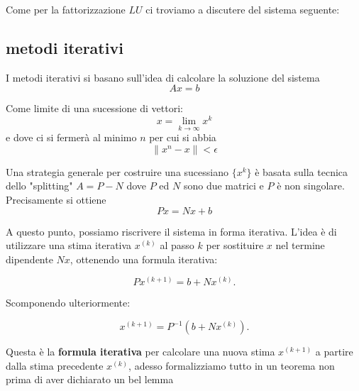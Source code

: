 Come per la fattorizzazione $LU$ ci troviamo a discutere del sistema seguente:

\subsection{metodi iterativi}
I metodi iterativi si basano sull'idea di calcolare la soluzione del sistema 
\[
    Ax = b
\]

Come limite di una sucessione di vettori:
\[
    x = \lim_{k\to\infty}x^k
\]
e dove ci si fermerà al minimo $n$ per cui si abbia 
\[
    \|x^n-x\|<\epsilon 
\]

Una strategia generale per costruire una sucessiano $\{x^k\}$ è basata sulla tecnica dello "splitting" $A = P- N $ dove $P$ ed $N$ sono due matrici e $P$ è non singolare. Precisamente si ottiene
\[
    Px = Nx + b
\]

A questo punto, possiamo riscrivere il sistema in forma iterativa. L'idea è di utilizzare una stima iterativa \( x^{(k)} \) al passo \( k \) per sostituire \( x \) nel termine dipendente \( N x \), ottenendo una formula iterativa:

\[
P x^{(k+1)} = b + N x^{(k)}.
\]

Scomponendo ulteriormente:

\[
x^{(k+1)} = P^{-1}(b + N x^{(k)}).
\]

Questa è la \textbf{formula iterativa} per calcolare una nuova stima \( x^{(k+1)} \) a partire dalla stima precedente \( x^{(k)} \), adesso formalizziamo tutto in un teorema non prima di aver dichiarato un bel lemma


